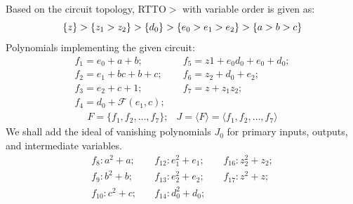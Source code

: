 \begin{Example}
Based on the circuit topology, RTTO$>$ with variable order is given as:
\begin{equation*}
   \{z\}>\{z_1> z_2\}>\{d_0\}>\{e_0> e_1> e_2\}>\{a> b> c\}\\ 
\end{equation*}
Polynomials implementing the given circuit:
\begin{equation}
\begin{split}
 f_1 = e_0 + a + b; &\quad f_5 = z1 + e_0d_0 + e_0 + d_0; \\
 f_2 = e_1 + bc + b + c; &\quad f_6 = z_2 + d_0 + e_2; \\
 f_3 = e_2 + c + 1; &\quad f_7 = z + z_1z_2; \\
 f_4 = d_0 + \mathcal{F}(e_1,c);  
\end{split}
\end{equation}
\begin{equation}
\begin{split}
F = \{f_1,f_2,\dots,f_7\}; & J = \langle F\rangle = \langle f_1,f_2,\dots,f_7\rangle
\end{split}
\end{equation}
We shall add the ideal of vanishing polynomials $J_0$ for primary inputs, outputs, and intermediate variables. 
\begin{align*}
 f_{8}:a^2 + a; &\quad f_{12}:e_1^2 + e_1; &\quad f_{16}:z_2^2 + z_2;\\
 f_{9}:b^2 + b; &\quad f_{13}:e_2^2 + e_2; &\quad f_{17}:z^2 + z;\\
 f_{10}:c^2 + c; &\quad f_{14}:d_0^2 + d_0; \\

\end{align*}
\end{Example}
